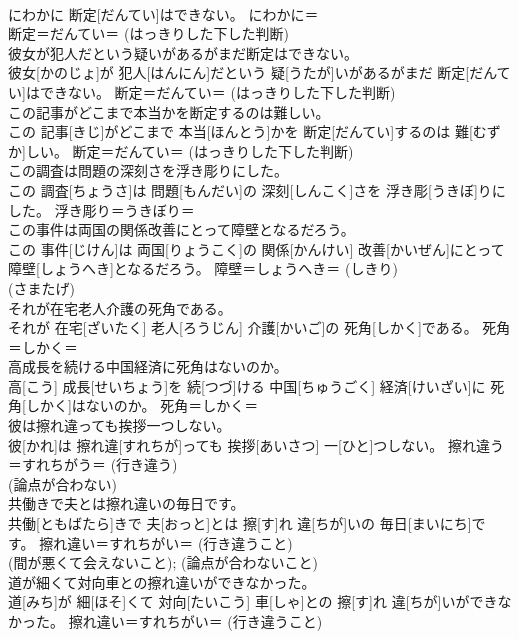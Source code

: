 \documentclass[8pt]{extreport}
\begin{document}
\begin{CJK}{UTF8}{min}
{\\	にわかに 断定[だんてい]はできない。	にわかに＝ 
\\	断定＝だんてい＝ (はっきりした下した判断) 
\\	彼女が犯人だという疑いがあるがまだ断定はできない。	
\\	彼女[かのじょ]が 犯人[はんにん]だという 疑[うたが]いがあるがまだ 断定[だんてい]はできない。	断定＝だんてい＝ (はっきりした下した判断) 
\\	この記事がどこまで本当かを断定するのは難しい。	
\\	この 記事[きじ]がどこまで 本当[ほんとう]かを 断定[だんてい]するのは 難[むずか]しい。	断定＝だんてい＝ (はっきりした下した判断) 
\\	この調査は問題の深刻さを浮き彫りにした。	
\\	この 調査[ちょうさ]は 問題[もんだい]の 深刻[しんこく]さを 浮き彫[うきぼ]りにした。	浮き彫り＝うきぼり＝ 
\\	この事件は両国の関係改善にとって障壁となるだろう。	
\\	この 事件[じけん]は 両国[りょうこく]の 関係[かんけい] 改善[かいぜん]にとって 障壁[しょうへき]となるだろう。	障壁＝しょうへき＝ (しきり) 
\\	(さまたげ) 
\\	それが在宅老人介護の死角である。	
\\	それが 在宅[ざいたく] 老人[ろうじん] 介護[かいご]の 死角[しかく]である。	死角＝しかく＝ 
\\	高成長を続ける中国経済に死角はないのか。	
\\	高[こう] 成長[せいちょう]を 続[つづ]ける 中国[ちゅうごく] 経済[けいざい]に 死角[しかく]はないのか。	死角＝しかく＝ 
\\	彼は擦れ違っても挨拶一つしない。	
\\	彼[かれ]は 擦れ違[すれちが]っても 挨拶[あいさつ] 一[ひと]つしない。	擦れ違う＝すれちがう＝ (行き違う) 
\\	(論点が合わない)
\\	共働きで夫とは擦れ違いの毎日です。	
\\	共働[ともばたら]きで 夫[おっと]とは 擦[す]れ 違[ちが]いの 毎日[まいにち]です。	擦れ違い＝すれちがい＝ (行き違うこと) 
\\	(間が悪くて会えないこと); (論点が合わないこと)
\\	道が細くて対向車との擦れ違いができなかった。	
\\	道[みち]が 細[ほそ]くて 対向[たいこう] 車[しゃ]との 擦[す]れ 違[ちが]いができなかった。	擦れ違い＝すれちがい＝ (行き違うこと) 
}
\end{CJK}
\end{document}
